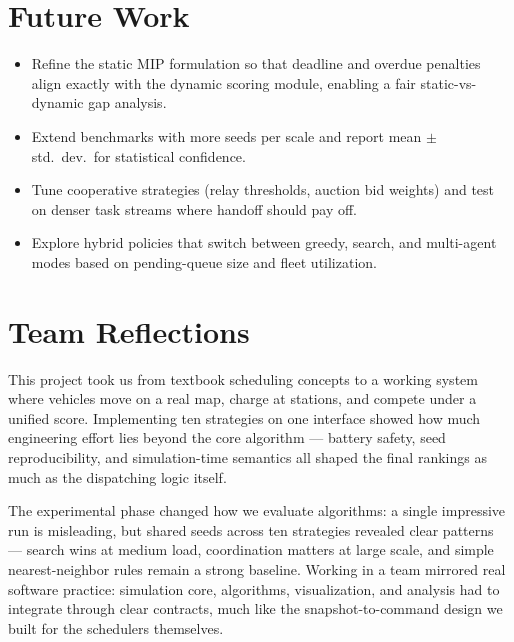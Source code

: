 \section{Future Work}

\begin{itemize}[leftmargin=4em]
    \item Refine the static MIP formulation so that deadline and overdue penalties align exactly with the dynamic scoring module, enabling a fair static-vs-dynamic gap analysis.
    \item Extend benchmarks with more seeds per scale and report mean $\pm$ std.\ dev.\ for statistical confidence.
    \item Tune cooperative strategies (relay thresholds, auction bid weights) and test on denser task streams where handoff should pay off.
    \item Explore hybrid policies that switch between greedy, search, and multi-agent modes based on pending-queue size and fleet utilization.
\end{itemize}

\section{Team Reflections}

This project took us from textbook scheduling concepts to a working system where vehicles move on a real map, charge at stations, and compete under a unified score. Implementing ten strategies on one interface showed how much engineering effort lies beyond the core algorithm --- battery safety, seed reproducibility, and simulation-time semantics all shaped the final rankings as much as the dispatching logic itself.

The experimental phase changed how we evaluate algorithms: a single impressive run is misleading, but shared seeds across ten strategies revealed clear patterns --- search wins at medium load, coordination matters at large scale, and simple nearest-neighbor rules remain a strong baseline. Working in a team mirrored real software practice: simulation core, algorithms, visualization, and analysis had to integrate through clear contracts, much like the snapshot-to-command design we built for the schedulers themselves.
